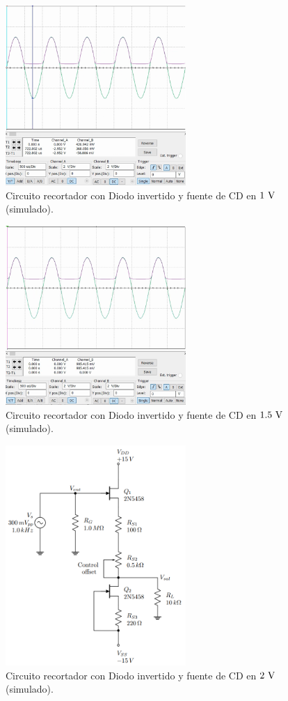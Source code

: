 \documentclass[journal]{IEEEtran}
\begin{document}
\begin{figure}[H]
        \centering
        \includegraphics[width=2.7in]{SignalSimulated_12.png}
        \caption{Circuito recortador con Diodo invertido y fuente de CD en $1~\textnormal{V}$ (simulado).}
        \label{fig:SignalSimulated_12}
\end{figure}
\begin{figure}[H]
        \centering
        \includegraphics[width=2.7in]{SignalSimulated_13.png}
        \caption{Circuito recortador con Diodo invertido y fuente de CD en $1.5~\textnormal{V}$ (simulado).}
        \label{fig:SignalSimulated_13}
\end{figure}
\begin{figure}[H]
        \centering
        \includegraphics[width=2.7in]{CIRC2_2.png}
        \caption{Circuito recortador con Diodo invertido y fuente de CD en $2~\textnormal{V}$ (simulado).}
        \label{fig:SignalSimulated_14}
\end{figure}
\end{document}
